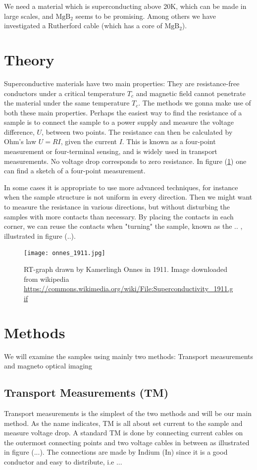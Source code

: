 \documentclass{comjnl}
\newcommand*\chem[1]{\ensuremath{\mathrm{#1}}}
\begin{document}
We need a material which is superconducting above 20K, which can be made in large scales, and \chem{MgB_2} seems to be promising. Among others we have investigated a Rutherford cable (which has a core of \chem{MgB_2}).

\section{Theory}\label{Sec:Theory}
Superconductive materials have two main properties: They are resistance-free conductors under a critical temperature $T_c$ and magnetic field cannot penetrate the material under the same temperature $T_c$. The methods we gonna make use of both these main properties. Perhaps the easiest way to find the resistance of a sample is to connect the sample to a power supply and measure the voltage difference, $U$, between two points. The resistance can then be calculated by Ohm's law $U=RI$, given the current $I$. This is known as a four-point measurement or four-terminal sensing, and is widely used in transport measurements. No voltage drop corresponds to zero resistance. In figure (\ref{fig:onnes_1911}) one can find a sketch of a four-point measurement. 

In some cases it is appropriate to use more advanced techniques, for instance when the sample structure is not uniform in every direction. Then we might want to measure the resistance in various directions, but without disturbing the samples with more contacts than necessary. By placing the contacts in each corner, we can reuse the contacts when "turning" the sample, known as the .. , illustrated in figure (..). 

\begin{figure}[h]
\centering
\texttt{[image: onnes\_1911.jpg]}
\caption{RT-graph drawn by Kamerlingh Onnes in 1911. Image downloaded from wikipedia \url{https://commons.wikimedia.org/wiki/File:Superconductivity_1911.gif} \label{fig:onnes_1911}}
\end{figure}

\section{Methods}\label{Sec:Methods}
We will examine the samples using mainly two methods: Transport measurements and magneto optical imaging

\subsection{Transport Measurements (TM)}
Transport measurements is the simplest of the two methods and will be our main method. As the name indicates, TM is all about set current to the sample and measure voltage drop. A standard TM is done by connecting current cables on the outermost connecting points and two voltage cables in between as illustrated in figure (...). The connections are made by Indium (In) since it is a good conductor and easy to distribute, i.e ...
\end{document}
